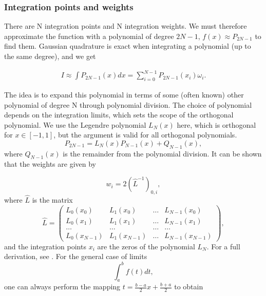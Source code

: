 \documentclass{emulateapj}
\begin{document}
\subsubsection{Integration points and weights}
There are N integration points and N integration weights. We must therefore approximate the function with a polynomial of degree $2N-1$, $f(x) \approx P_{2N-1}$ to find them. Gaussian quadrature is exact when integrating a polynomial (up to the same degree), and we get

\begin{align}
	I \approx \int P_{2N-1}(x)dx = \sum^{N-1}_{i=0}P_{2N-1}(x_i) \omega_i.
\end{align}

The idea is to expand this polynomial in terms of some (often known) other polynomial of degree N through polynomial division. The choice of polynomial depends on the integration limits, which sets the scope of the orthogonal polynomial. We use the Legendre polynomial $L_N(x)$ here, which is orthogonal for $x\in [-1,1]$, but the argument is valid for all orthogonal polynomials.
\begin{equation}
	P_{2N-1} = L_N(x)P_{N-1}(x) + Q_{N-1}(x),
\end{equation}
where $Q_{N-1}(x)$ is the remainder from the polynomial division. It can be shown that the weights are given by

\begin{equation}
    w_i = 2\left(\hat{L}^{-1}\right)_{0,i},
\end{equation}
where $\hat{L}$ is the matrix
\begin{equation*}
   \hat{L}=\left(\begin{array} {cccc} L_0(x_0)  & L_1(x_0) &\dots &L_{N-1}(x_0)\\
                                   L_0(x_1)  & L_1(x_1) &\dots &L_{N-1}(x_1)\\
                                   \dots  & \dots &\dots &\dots\\
L_0(x_{N-1})  & L_1(x_{N-1}) &\dots &L_{N-1}(x_{N-1})
\end{array}\right),
\end{equation*}
and the integration points $x_i$ are the zeros of the polynomial $L_N$. For a full derivation, see \cite{Lecture1}. For the general case of limits
\begin{equation}
    \int_a^b f(t) dt,
\end{equation}
one can always perform the mapping $t = \frac{b-a}{2}x + \frac{b+a}{2}$ to obtain
\end{document}
